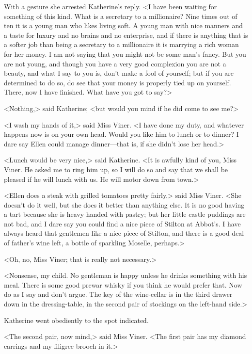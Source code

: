 With a gesture she arrested Katherine's reply. <I have been waiting for something of this kind. What is a secretary to a millionaire? Nine times out of ten it is a young man who likes living soft. A young man with nice manners and a taste for luxury and no brains and no enterprise, and if there is anything that is a softer job than being a secretary to a millionaire it is marrying a rich woman for her money. I am not saying that you might not be some man's fancy. But you are not young, and though you have a very good complexion you are not a beauty, and what I say to you is, don't make a fool of yourself; but if you are determined to do so, do see that your money is properly tied up on yourself. There, now I have finished. What have you got to say?>

<Nothing,> said Katherine; <but would you mind if he did come to see me?>

<I wash my hands of it,> said Miss Viner. <I have done my duty, and whatever happens now is on your own head. Would you like him to lunch or to dinner? I dare say Ellen could manage dinner—that is, if she didn't lose her head.>

<Lunch would be very nice,> said Katherine. <It is awfully kind of you, Miss Viner. He asked me to ring him up, so I will do so and say that we shall be pleased if he will lunch with us. He will motor down from town.>

<Ellen does a steak with grilled tomatoes pretty fairly,> said Miss Viner. <She doesn't do it well, but she does it better than anything else. It is no good having a tart because she is heavy handed with pastry; but her little castle puddings are not bad, and I dare say you could find a nice piece of Stilton at Abbot's. I have always heard that gentlemen like a nice piece of Stilton, and there is a good deal of father's wine left, a bottle of sparkling Moselle, perhaps.>

<Oh, no, Miss Viner; that is really not necessary.>

<Nonsense, my child. No gentleman is happy unless he drinks something with his meal. There is some good prewar whisky if you think he would prefer that. Now do as I say and don't argue. The key of the wine-cellar is in the third drawer down in the dressing-table, in the second pair of stockings on the left-hand side.>

Katherine went obediently to the spot indicated.

<The second pair, now mind,> said Miss Viner. <The first pair has my diamond earrings and my filigree brooch in it.>

